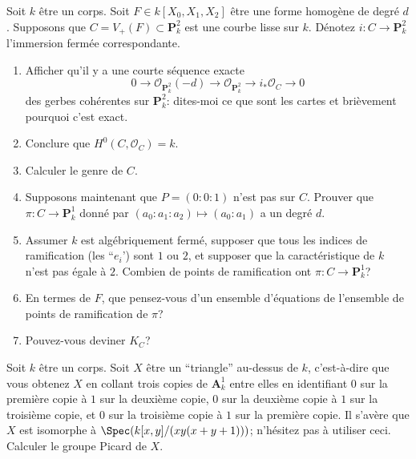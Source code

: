 \begin{exercise}
\label{exercise-genus-plane-curve}
Soit $k$ être
un corps. Soit $F \in k[X_0, X_1, X_2]$ être une forme homogène
de degré $d$. Supposons que $C = V_{+}(F) \subset \mathbf{P}^2_k$ est une courbe
lisse sur $k$. Dénotez $i : C \to \mathbf{P}^2_k$ l'immersion fermée correspondante.
\begin{enumerate}
\item Afficher qu'il y a une courte séquence exacte
$$
0 \to \mathcal{O}_{\mathbf{P}^2_k}(-d)
\to \mathcal{O}_{\mathbf{P}^2_k} \to i_*\mathcal{O}_C \to 0
$$
des gerbes cohérentes sur $\mathbf{P}^2_k$: dites-moi ce que sont les cartes
et brièvement pourquoi c'est exact.
\item Conclure que $H^0(C, \mathcal{O}_C) = k$.
\item Calculer le genre de $C$.
\item Supposons maintenant que $P = (0 : 0 : 1)$ n'est pas sur $C$.
Prouver que $\pi : C \to \mathbf{P}^1_k$ donné par $(a_0 : a_1 : a_2) \mapsto (a_0 : a_1)$
a un degré $d$.
\item Assumer $k$ est algébriquement fermé, supposer que tous les indices de ramification
(les ``$e_i$') sont $1$ ou $2$, et supposer que la caractéristique de $k$
n'est pas égale à $2$. Combien de points
de ramification ont $\pi : C \to \mathbf{P}^1_k$?
\item En termes de $F$, que pensez-vous d'un ensemble d'équations de
l'ensemble de points de ramification de $\pi$?
\item Pouvez-vous deviner $K_C$?
\end{enumerate}
\end{exercise}

\begin{exercise}
\label{exercise-Pic-triangle}
Soit $k$ être un corps. Soit $X$ être un ``triangle'' au-dessus de $k$,
c'est-à-dire que vous obtenez $X$ en collant trois copies de $\mathbf{A}^1_k$ entre elles en
identifiant $0$ sur la première copie à $1$ sur la deuxième copie, $0$ sur la
deuxième copie à $1$ sur la troisième copie, et $0$ sur la troisième copie à
$1$ sur la première copie. Il s'avère que $X$ est isomorphe
à $\Spec(k[x, y]/(xy(x + y + 1)))$; n'hésitez pas à utiliser
ceci. Calculer le groupe Picard de $X$.
\end{exercise}

